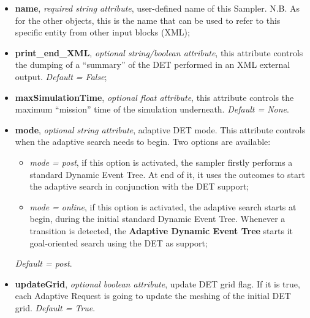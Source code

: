 \begin{itemize}
  \itemsep0em
  \item \textbf{name}, \textit{required string attribute}, user-defined name of this Sampler. N.B. As for the other objects, this is the name that can be used to refer to this specific entity from other input blocks (XML);
  \item \textbf{print\_end\_XML}, \textit{optional string/boolean attribute}, this attribute controls the dumping of a ``summary'' of the DET performed in an XML external output. \textit{Default = False};
  \item \textbf{maxSimulationTime}, \textit{optional float attribute}, this attribute controls the maximum ``mission'' time of the simulation underneath. \textit{Default = None}.
  \item \textbf{mode}, \textit{optional string attribute}, adaptive DET mode. This attribute controls when the adaptive search needs to begin. Two options are available:
      \begin{itemize}
         \item \textit{mode = post}, if this option is activated, the sampler firstly performs a standard Dynamic Event Tree. At end of it, it uses the outcomes to start the adaptive search in conjunction with the DET support;
         \item \textit{mode = online},  if this option is activated, the adaptive search starts at begin, during the initial standard Dynamic Event Tree. Whenever a transition is detected, the \textbf{Adaptive Dynamic Event Tree} starts it goal-oriented search using the DET as support;
      \end{itemize}
      \textit{Default = post}.
  \item \textbf{updateGrid}, \textit{optional boolean attribute}, update DET grid flag. If it is true, each Adaptive Request is going to update the meshing of the initial DET grid.  \textit{Default = True}.
\end{itemize}
